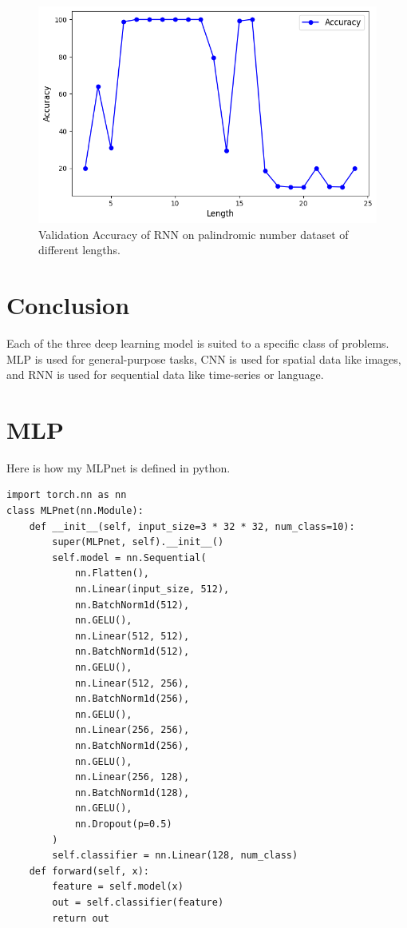 \documentclass[12pt]{article}
\begin{document}
\begin{figure}
    \centering
    \includegraphics[width=0.5\linewidth]{p3_fig1.png}
    \caption{Validation Accuracy of RNN on palindromic number dataset of different lengths.}
    \label{fig:p4}
\end{figure}

\section{Conclusion}

Each of the three deep learning model is suited to a specific class of problems. MLP is used for general-purpose tasks, CNN is used for spatial data like images, and RNN is used for sequential data like time-series or language.

% 
% 

\newpage
\appendix

\section{MLP}
\label{sec:Appendix_A}

Here is how my MLPnet is defined in python.

\begin{verbatim}
import torch.nn as nn
class MLPnet(nn.Module):
    def __init__(self, input_size=3 * 32 * 32, num_class=10):
        super(MLPnet, self).__init__()
        self.model = nn.Sequential(
            nn.Flatten(),
            nn.Linear(input_size, 512),
            nn.BatchNorm1d(512),
            nn.GELU(),
            nn.Linear(512, 512),
            nn.BatchNorm1d(512),
            nn.GELU(),
            nn.Linear(512, 256),
            nn.BatchNorm1d(256),
            nn.GELU(),
            nn.Linear(256, 256),
            nn.BatchNorm1d(256),
            nn.GELU(),
            nn.Linear(256, 128),
            nn.BatchNorm1d(128),
            nn.GELU(),
            nn.Dropout(p=0.5)
        )
        self.classifier = nn.Linear(128, num_class)
    def forward(self, x):
        feature = self.model(x)
        out = self.classifier(feature)
        return out
\end{verbatim}

 
\end{document}

